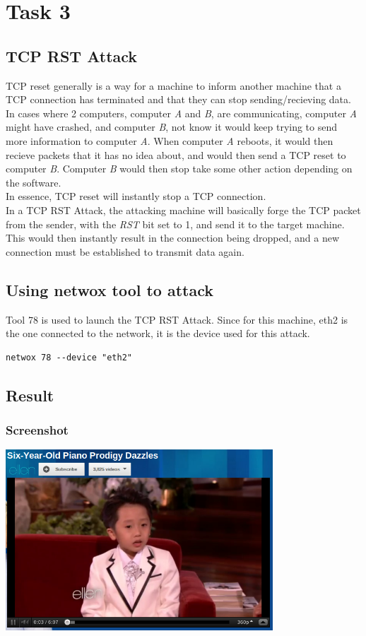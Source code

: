 \documentclass[12pt]{article}
\begin{document}
\section{Task 3}
\subsection{TCP RST Attack}
TCP reset generally is a way for a machine to inform another machine that a TCP connection has terminated and that they can stop sending/recieving data. In cases where 2 computers, computer \emph{A} and \emph{B}, are communicating, computer \emph{A} might have crashed, and computer \emph{B}, not know it would keep trying to send more information to computer \emph{A}. When computer \emph{A} reboots, it would then recieve packets that it has no idea about, and would then send a TCP reset to computer \emph{B}. Computer \emph{B} would then stop take some other action depending on the software. \\

In essence, TCP reset will instantly stop a TCP connection. \\

In a TCP RST Attack, the attacking machine will basically forge the TCP packet from the sender, with the \emph{RST} bit set to 1, and send it to the target machine. This would then instantly result in the connection being dropped, and a new connection must be established to transmit data again. \\

\subsection{Using netwox tool to attack}
Tool 78 is used to launch the TCP RST Attack. Since for this machine, eth2 is the one connected to the network, it is the device used for this attack. \\

\begin{lstlisting}
netwox 78 --device "eth2"
\end{lstlisting}

\subsection{Result}
\subsubsection{Screenshot}
\begin{center}
\includegraphics[width=100mm]{task31.png}
\end{center}
\end{document}

